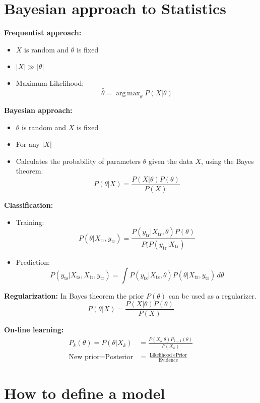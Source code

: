 \documentclass{book}
\DeclareMathOperator*{\argmax}{arg\,max}
\begin{document}
\section{Bayesian approach to Statistics}
\noindent
\textbf{Frequentist approach:}
\begin{itemize}
\item $X$ is random and $\theta$ is fixed 
\item $\vert X \vert \gg \vert \theta \vert$
\item Maximum Likelihood: \[\hat{\theta} = \argmax_{\theta} P(X \vert \theta)\]
\end{itemize}

\noindent
\textbf{Bayesian approach:}
\begin{itemize}
\item $\theta$ is random and $X$ is fixed
\item For any $\vert X \vert$
\item Calculates the probability of parameters $\theta$ given the data $X$, using the Bayes theorem.
\[ P(\theta \vert X) =  \frac{P(X \vert \theta)P(\theta)}{P(X)} \]
\end{itemize}

\noindent
\textbf{Classification:}
\begin{itemize}
\item Training: 
\[P(\theta \vert X_{\text{tr}}, y_{\text{tr}}) =  \frac{P(y_{\text{tr}} \vert X_{\text{tr}},\theta)P(\theta)}{P(P(y_{\text{tr}} \vert X_{\text{tr}})}\]
\item Prediction:
\[P(y_{\text{ts}} \vert X_{\text{ts}}, X_{\text{tr}}, y_{\text{tr}}) = \int P(y_{\text{ts}} \vert X_{\text{ts}}, \theta) P(\theta \vert X_{\text{tr}}, y_{\text{tr}}) \, d\theta\]
\end{itemize}

\noindent
\textbf{Regularization:}
In Bayes theorem the prior $P(\theta)$ can be used as a regularizer.
\[ P(\theta \vert X) =  \frac{P(X \vert \theta)P(\theta)}{P(X)} \]

\noindent
\textbf{On-line learning:}
\begin{align*} 
P_k(\theta) = P(\theta \vert X_k) &= \frac{P(X_k \vert \theta)P_{k-1}(\theta)}{P(X_k)} \\
\text{New prior} = \text{Posterior} &= \frac{\text{Likelihood} \times \text{Prior}}{\text{Evidence}}
\end{align*}

\section{How to define a model}
\end{document}
